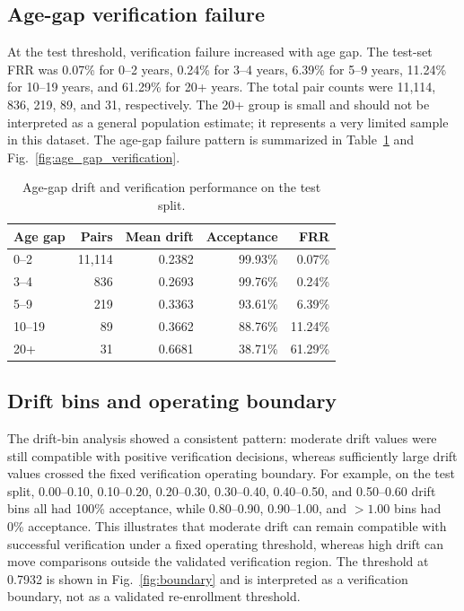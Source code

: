 \documentclass[conference]{IEEEtran}
\begin{document}
\subsection{Age-gap verification failure}
At the test threshold, verification failure increased with age gap. The test-set FRR was 0.07\% for 0--2 years, 0.24\% for 3--4 years, 6.39\% for 5--9 years, 11.24\% for 10--19 years, and 61.29\% for 20+ years. The total pair counts were 11,114, 836, 219, 89, and 31, respectively. The 20+ group is small and should not be interpreted as a general population estimate; it represents a very limited sample in this dataset. The age-gap failure pattern is summarized in Table~\ref{tab:agegap} and Fig.~\ref{fig:age_gap_verification}.

\begin{table}[t]
\centering
\caption{Age-gap drift and verification performance on the test split.}
\label{tab:agegap}
\begin{tabular}{@{}lrrrr@{}}
\toprule
Age gap & Pairs & Mean drift & Acceptance & FRR \\
\midrule
0--2 & 11,114 & 0.2382 & 99.93\% & 0.07\% \\
3--4 & 836 & 0.2693 & 99.76\% & 0.24\% \\
5--9 & 219 & 0.3363 & 93.61\% & 6.39\% \\
10--19 & 89 & 0.3662 & 88.76\% & 11.24\% \\
20+ & 31 & 0.6681 & 38.71\% & 61.29\% \\
\bottomrule
\end{tabular}
\end{table}

\subsection{Drift bins and operating boundary}
The drift-bin analysis showed a consistent pattern: moderate drift values were still compatible with positive verification decisions, whereas sufficiently large drift values crossed the fixed verification operating boundary. For example, on the test split, 0.00--0.10, 0.10--0.20, 0.20--0.30, 0.30--0.40, 0.40--0.50, and 0.50--0.60 drift bins all had 100\% acceptance, while 0.80--0.90, 0.90--1.00, and $>1.00$ bins had 0\% acceptance. This illustrates that moderate drift can remain compatible with successful verification under a fixed operating threshold, whereas high drift can move comparisons outside the validated verification region. The threshold at 0.7932 is shown in Fig.~\ref{fig:boundary} and is interpreted as a verification boundary, not as a validated re-enrollment threshold.
\end{document}
